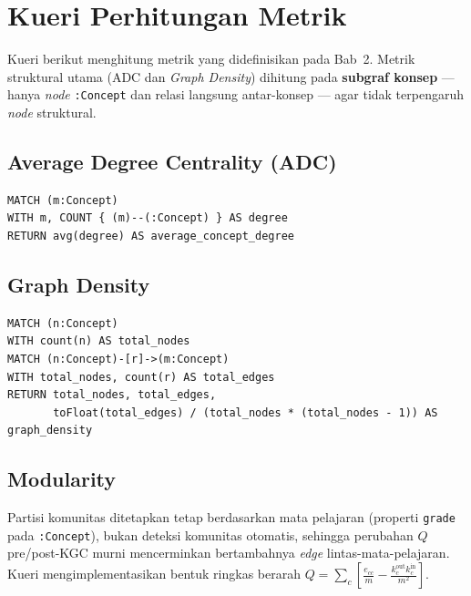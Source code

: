\documentclass[main]{subfiles}
\begin{document}
\section{Kueri Perhitungan Metrik}
\label{lamp:cypher-metrik}

Kueri berikut menghitung metrik yang didefinisikan pada Bab~2. Metrik
struktural utama (ADC dan \textit{Graph Density}) dihitung pada
\textbf{subgraf konsep} --- hanya \textit{node} \texttt{:Concept} dan relasi
langsung antar-konsep --- agar tidak terpengaruh \textit{node} struktural.

\subsection{Average Degree Centrality (ADC)}

\begin{lstlisting}[style=cypherbox,caption={ADC pada subgraf konsep.},label={lst:cypher-adc}]
MATCH (m:Concept)
WITH m, COUNT { (m)--(:Concept) } AS degree
RETURN avg(degree) AS average_concept_degree
\end{lstlisting}

\subsection{Graph Density}

\begin{lstlisting}[style=cypherbox,caption={Graph Density pada subgraf konsep. Untuk kondisi pre-KGC tambahkan filter \texttt{WHERE NOT type(r) STARTS WITH 'LINTAS\_BUKU'}.},label={lst:cypher-density}]
MATCH (n:Concept)
WITH count(n) AS total_nodes
MATCH (n:Concept)-[r]->(m:Concept)
WITH total_nodes, count(r) AS total_edges
RETURN total_nodes, total_edges,
       toFloat(total_edges) / (total_nodes * (total_nodes - 1)) AS graph_density
\end{lstlisting}

\subsection{Modularity}

Partisi komunitas ditetapkan tetap berdasarkan mata pelajaran (properti
\texttt{grade} pada \texttt{:Concept}), bukan deteksi komunitas otomatis,
sehingga perubahan $Q$ pre/post-KGC murni mencerminkan bertambahnya
\textit{edge} lintas-mata-pelajaran. Kueri mengimplementasikan bentuk ringkas
berarah $Q = \sum_{c}\left[\frac{e_{cc}}{m} - \frac{k_c^{\text{out}}k_c^{\text{in}}}{m^2}\right]$.
\end{document}
